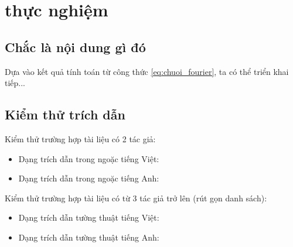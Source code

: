 \chapter{thực nghiệm}
\section{Chắc là nội dung gì đó}

Dựa vào kết quả tính toán từ công thức \eqref{eq:chuoi_fourier}, ta có thể triển khai tiếp...

\section{Kiểm thử trích dẫn}

Kiểm thử trường hợp tài liệu có 2 tác giả:
\begin{itemize}
    \item Dạng trích dẫn trong ngoặc tiếng Việt: \parencite{tran2016}
    \item Dạng trích dẫn trong ngoặc tiếng Anh: \parencite{smith2018}
\end{itemize}

Kiểm thử trường hợp tài liệu có từ 3 tác giả trở lên (rút gọn danh sách):
\begin{itemize}
    \item Dạng trích dẫn tường thuật tiếng Việt: \textcite{le2023}
    \item Dạng trích dẫn tường thuật tiếng Anh: \textcite{williams2021}
\end{itemize}